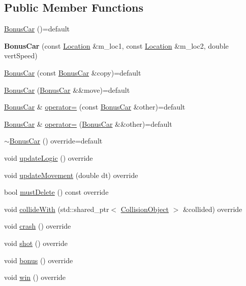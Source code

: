 \subsection*{Public Member Functions}
\begin{DoxyCompactItemize}
\item 
\hyperlink{classroadfighter_1_1BonusCar_a5d4ced3e282f446fbe290be592bc8346}{Bonus\+Car} ()=default
\item 
\mbox{\label{classroadfighter_1_1BonusCar_ac759d2c4005dab4bc923cf8e08f50115}} 
{\bfseries Bonus\+Car} (const \hyperlink{classroadfighter_1_1Location}{Location} \&m\+\_\+loc1, const \hyperlink{classroadfighter_1_1Location}{Location} \&m\+\_\+loc2, double vert\+Speed)
\item 
\hyperlink{classroadfighter_1_1BonusCar_ae0308526b0386e16442bbfdd291f3c29}{Bonus\+Car} (const \hyperlink{classroadfighter_1_1BonusCar}{Bonus\+Car} \&copy)=default
\item 
\hyperlink{classroadfighter_1_1BonusCar_a52b06b6ce44208f2df0e0679193008fa}{Bonus\+Car} (\hyperlink{classroadfighter_1_1BonusCar}{Bonus\+Car} \&\&move)=default
\item 
\hyperlink{classroadfighter_1_1BonusCar}{Bonus\+Car} \& \hyperlink{classroadfighter_1_1BonusCar_acd5303a50571433116089c1f63ab0a9e}{operator=} (const \hyperlink{classroadfighter_1_1BonusCar}{Bonus\+Car} \&other)=default
\item 
\hyperlink{classroadfighter_1_1BonusCar}{Bonus\+Car} \& \hyperlink{classroadfighter_1_1BonusCar_a9fd4f5d8559cd48aa408ff032b92c9f4}{operator=} (\hyperlink{classroadfighter_1_1BonusCar}{Bonus\+Car} \&\&other)=default
\item 
\hyperlink{classroadfighter_1_1BonusCar_a055742bdc09217d56c34c7f582cf7670}{$\sim$\+Bonus\+Car} () override=default
\item 
void \hyperlink{classroadfighter_1_1BonusCar_a21d55ad1e1595ac6c86ca20f8819778b}{update\+Logic} () override
\item 
void \hyperlink{classroadfighter_1_1BonusCar_a2d3d584ca34a5df3b3c833123a9bbc30}{update\+Movement} (double dt) override
\item 
bool \hyperlink{classroadfighter_1_1BonusCar_a19d01e92134634a82ae53f0d017956aa}{must\+Delete} () const override
\item 
void \hyperlink{classroadfighter_1_1BonusCar_ad1ce65b53e5652eac482a7b00c9a1d51}{collide\+With} (std\+::shared\+\_\+ptr$<$ \hyperlink{classroadfighter_1_1CollisionObject}{Collision\+Object} $>$ \&collided) override
\item 
void \hyperlink{classroadfighter_1_1BonusCar_aad0a2a41a1b84c6487c1fc204b5f7cb7}{crash} () override
\item 
void \hyperlink{classroadfighter_1_1BonusCar_a02edcd22a86c1f98642c3703ef8dfb16}{shot} () override
\item 
void \hyperlink{classroadfighter_1_1BonusCar_a3d2d15df036c419cd9ad4fbc6fcd4ad9}{bonus} () override
\item 
void \hyperlink{classroadfighter_1_1BonusCar_afb2d142de799694db896ba875d7d0c27}{win} () override
\end{DoxyCompactItemize}


